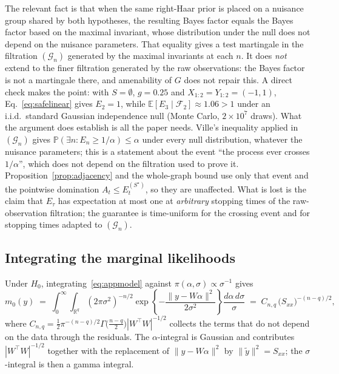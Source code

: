 \documentclass[pdflatex,sn-apa]{sn-jnl}
\theoremstyle{thmstyleone}%
\theoremstyle{thmstyletwo}%
\theoremstyle{thmstylethree}%
\newcommand{\Fcal}{\mathcal{F}}
\newcommand{\Prob}{\mathbb{P}}
\newcommand{\Exp}{\mathbb{E}}
\newcommand{\Real}{\mathbb{R}}
\begin{document}
\begin{appendices}
The relevant fact \citep{berger1998bayes,hendriksen2021optional} is that when
the same right-Haar prior is placed on a nuisance group shared by both
hypotheses, the resulting Bayes factor equals the Bayes factor based on the
maximal invariant, whose distribution under the null does not depend on the
nuisance parameters. That equality gives a test martingale in the filtration $(\mathcal G_n)$
generated by the maximal invariants at each $n$. It does \emph{not} extend to
the finer filtration generated by the raw observations: the Bayes factor is
not a martingale there, and amenability of $G$ does not repair this. A direct
check makes the point: with $S = \emptyset$, $g = 0.25$ and
$X_{1:2} = Y_{1:2} = (-1, 1)$, Eq.~\eqref{eq:safelinear} gives $E_2 = 1$, while
$\Exp[E_3 \mid \Fcal_2] \approx 1.06 > 1$ under an i.i.d.\ standard Gaussian
independence null (Monte Carlo, $2 \times 10^7$ draws). What the argument does
establish is all the paper needs. Ville's inequality applied in
$(\mathcal G_n)$ gives $\Prob(\exists n: E_n \ge 1/\alpha) \le \alpha$ under
every null distribution, whatever the nuisance parameters; this is a
statement about the event ``the process ever crosses $1/\alpha$'', which does
not depend on the filtration used to prove it. Proposition~\ref{prop:adjacency}
and the whole-graph bound use only that event and the pointwise domination
$A_t \le E^{(S^\star)}_t$, so they are unaffected. What is lost is the claim
that $E_\tau$ has expectation at most one at \emph{arbitrary} stopping times of
the raw-observation filtration; the guarantee is time-uniform for the
crossing event and for stopping times adapted to $(\mathcal G_n)$.

\subsection{Integrating the marginal likelihoods}

Under $H_0$, integrating~\eqref{eq:appmodel} against $\pi(\alpha,\sigma)
\propto \sigma^{-1}$ gives
\begin{equation}\label{eq:m0}
m_0(y) \;=\; \int_0^\infty \int_{\Real^q}
  (2\pi\sigma^2)^{-n/2}
  \exp\!\left\{-\frac{\|y - W\alpha\|^2}{2\sigma^2}\right\}
  \frac{d\alpha \, d\sigma}{\sigma}
\;=\; C_{n,q} \, \bigl(S_{xx}\bigr)^{-(n-q)/2},
\end{equation}
where $C_{n,q} = \tfrac12 \pi^{-(n-q)/2} \Gamma\!\bigl(\tfrac{n-q}{2}\bigr)
|W^\top W|^{-1/2}$ collects the terms that do not depend on the data through
the residuals. The $\alpha$-integral is Gaussian and contributes
$|W^\top W|^{-1/2}$ together with the replacement of $\|y-W\alpha\|^2$ by
$\|\tilde y\|^2 = S_{xx}$; the $\sigma$-integral is then a gamma integral.


\end{appendices}
\end{document}
